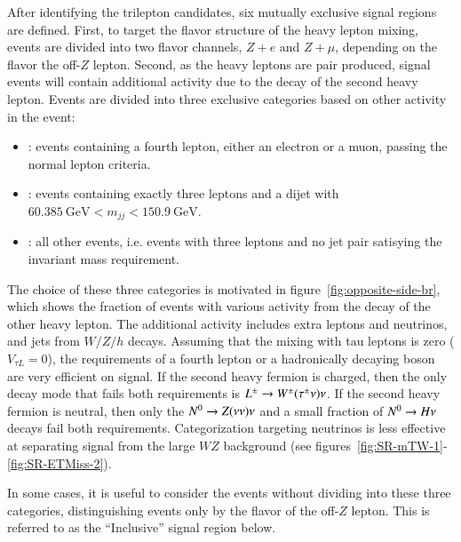After identifying the trilepton candidates, six mutually exclusive signal regions are defined. First, to target the flavor structure of the heavy lepton mixing, events are divided into two flavor channels, $Z+e$ and $Z+\mu$, depending on the flavor the off-$Z$ lepton. Second, as the heavy leptons are pair produced, signal events will contain additional activity due to the decay of the second heavy lepton. Events are divided into three exclusive categories based on other activity in the event:
  \begin{itemize}
  	\item \textbf{\fourl}: events containing a fourth lepton, either an electron or a muon, passing the normal lepton criteria. 
  	\item \textbf{\threeljj}: events containing exactly three leptons and a dijet with $60.385~\mbox{GeV}<m_{jj}<150.9~\mbox{GeV}$. 
  	\item \textbf{\threelo}: all other events, i.e. events with three leptons and no jet pair satisying the invariant mass requirement. 
  \end{itemize}

 The choice of these three categories is motivated in figure~\ref{fig:opposite-side-br}, which shows the fraction of events with various activity from the decay of the other heavy lepton. The additional activity includes extra leptons and neutrinos, and jets from $W/Z/h$ decays. Assuming that the mixing with tau leptons is zero ($V_{\tau L}=0$), the requirements of a fourth lepton or a hadronically decaying boson are very efficient on signal. If the second heavy fermion is charged, then the only decay mode that fails both requirements is $L^{\pm}\rightarrow W^{\pm}(\tau^{\pm}\nu)\nu$. If the second heavy fermion is neutral, then only the $N^{0}\rightarrow Z(\nu\nu)\nu$ and a small fraction of $N^{0} \rightarrow H\nu$ decays fail both requirements. Categorization targeting neutrinos is less effective at separating signal from the large $WZ$ background (see figures~\ref{fig:SR-mTW-1}-\ref{fig:SR-ETMiss-2}). 

In some cases, it is useful to consider the events without dividing into these three categories, distinguishing events only by the flavor of the off-$Z$ lepton. This is referred to as the ``Inclusive'' signal region below.

